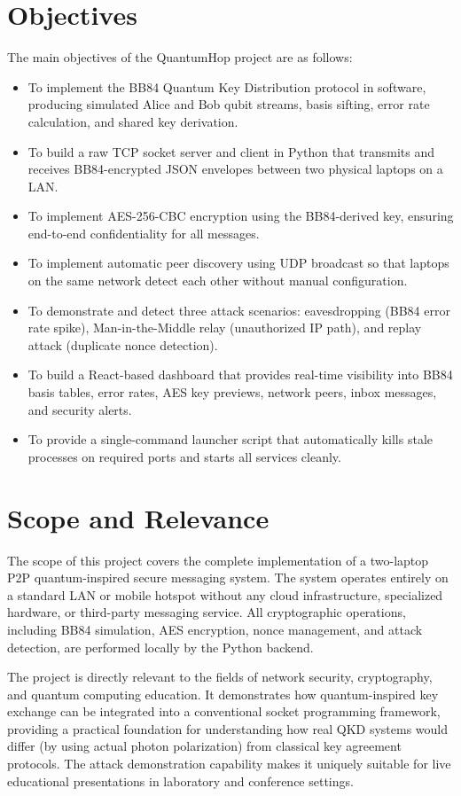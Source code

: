 \section{Objectives}

The main objectives of the QuantumHop project are as follows:

\begin{itemize}
    \item To implement the BB84 Quantum Key Distribution protocol in software, producing simulated Alice and Bob qubit streams, basis sifting, error rate calculation, and shared key derivation.
    \item To build a raw TCP socket server and client in Python that transmits and receives BB84-encrypted JSON envelopes between two physical laptops on a LAN.
    \item To implement AES-256-CBC encryption using the BB84-derived key, ensuring end-to-end confidentiality for all messages.
    \item To implement automatic peer discovery using UDP broadcast so that laptops on the same network detect each other without manual configuration.
    \item To demonstrate and detect three attack scenarios: eavesdropping (BB84 error rate spike), Man-in-the-Middle relay (unauthorized IP path), and replay attack (duplicate nonce detection).
    \item To build a React-based dashboard that provides real-time visibility into BB84 basis tables, error rates, AES key previews, network peers, inbox messages, and security alerts.
    \item To provide a single-command launcher script that automatically kills stale processes on required ports and starts all services cleanly.
\end{itemize}

\section{Scope and Relevance}

The scope of this project covers the complete implementation of a two-laptop P2P quantum-inspired secure messaging system. The system operates entirely on a standard LAN or mobile hotspot without any cloud infrastructure, specialized hardware, or third-party messaging service. All cryptographic operations, including BB84 simulation, AES encryption, nonce management, and attack detection, are performed locally by the Python backend.

The project is directly relevant to the fields of network security, cryptography, and quantum computing education. It demonstrates how quantum-inspired key exchange can be integrated into a conventional socket programming framework, providing a practical foundation for understanding how real QKD systems would differ (by using actual photon polarization) from classical key agreement protocols. The attack demonstration capability makes it uniquely suitable for live educational presentations in laboratory and conference settings.